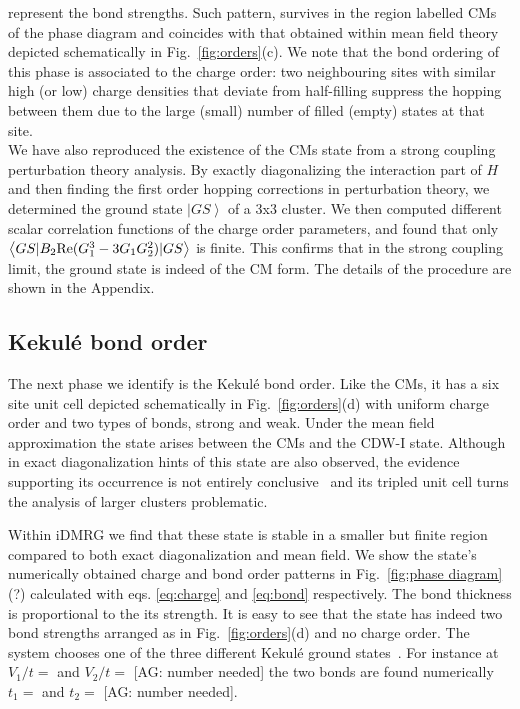 \documentclass[aps,prx,10pt,twocolumn,floatfix,superscriptaddress,showpacs,numerical,footinbib]{revtex4-1}
\newcommand{\noteAG}[1]{{\color{blue} [AG: #1]}}
\begin{document}
represent the bond strengths.
%
Such pattern, survives in the region labelled CMs of the phase diagram and coincides with that obtained within mean field theory~\cite{GCC13} 
depicted schematically in Fig.~\ref{fig:orders}(c).
%
We note that the bond ordering of this phase is associated to the charge order: two neighbouring sites with similar high (or low) charge densities
that deviate from half-filling suppress the hopping between them due to the large (small) number of filled (empty) states at that site. \\
% 
We have also reproduced the existence of the CMs state from a strong coupling perturbation theory analysis. 
%
By exactly diagonalizing the interaction part of $H$ and then finding the first order hopping corrections in perturbation theory, we determined the ground state $\left.|GS\right>$ of a 3x3 cluster. 
%
We then computed different scalar correlation functions of the charge order parameters, and found that only $\left<GS|B_2 {\rm Re}(G_1^3-3G_1G_2^2)|GS\right>$ is finite. 
%
This confirms that in the strong coupling limit, the ground state is indeed of the CM form. The details of the procedure are shown in the Appendix. 
%

\subsection{Kekul\'{e} bond order}
%
The next phase we identify is the Kekul\'{e}
bond order.
%
Like the CMs, it has a six site unit cell depicted schematically in Fig.~\ref{fig:orders}(d)
with uniform charge order and two types of bonds, strong and weak.
%
Under the mean field approximation the state arises between the CMs and the CDW-I state.
%
Although in exact diagonalization hints of this state are also observed,
the evidence supporting its occurrence is not entirely conclusive~\cite{GGNVC13} and
its tripled unit cell turns the analysis of larger clusters problematic.
%

Within iDMRG we find that these state is stable in a smaller but finite region compared to both 
exact diagonalization and mean field.
%
We show the state's numerically obtained charge and bond order patterns in Fig.~\ref{fig:phase diagram} (?) 
calculated with eqs. \eqref{eq:charge} and \eqref{eq:bond} respectively.
%
The bond thickness is proportional to the its strength.
%
It is easy to see that the state has indeed two bond strengths arranged as in Fig.~\ref{fig:orders}(d) 
and no charge order.
%
The system chooses one of the three different Kekul\'{e} ground states~\cite{WF10}.
%
For instance at $V_{1}/t=$ and $V_{2}/t=$\noteAG{number needed} the two bonds are found numerically $t_{1}=$ and $t_{2}=$\noteAG{number needed}.
\end{document}
